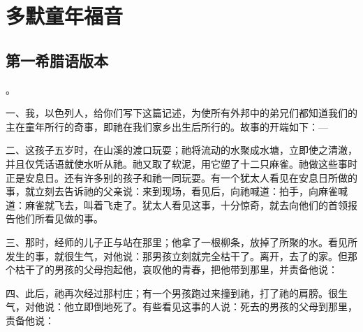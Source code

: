 
\chapter{多默童年福音}



\section{第一希腊语版本}

。\par

一、我，以色列人，给你们写下这篇记述，为使所有外邦中的弟兄们都知道我们的主在童年所行的奇事，即祂在我们家乡出生后所行的。故事的开端如下：—\par

二、这孩子五岁时，在山溪的渡口玩耍；祂将流动的水聚成水塘，立即使之清澈，并且仅凭话语就使水听从祂。祂又取了软泥，用它塑了十二只麻雀。祂做这些事时正是安息日。还有许多别的孩子和祂一同玩耍。有一个犹太人看见在安息日所做的事，就立刻去告诉祂的父亲说：来到现场，看见后，向祂喊道：拍手，向麻雀喊道：麻雀就飞去，叫着飞走了。犹太人看见这事，十分惊奇，就去向他们的首领报告他们所看见做的事。\par

三、那时，经师的儿子正与站在那里；他拿了一根柳条，放掉了所聚的水。看见所发生的事，就很生气，对他说：那男孩立刻就完全枯干了。离开，去了的家。但那个枯干了的男孩的父母抱起他，哀叹他的青春，把他带到那里，并责备他说：\par

四、此后，祂再次经过那村庄；有一个男孩跑过来撞到祂，打了祂的肩膀。很生气，对他说：他立即倒地死了。有些看见这事的人说：死去的男孩的父母到那里，责备他说：\par


